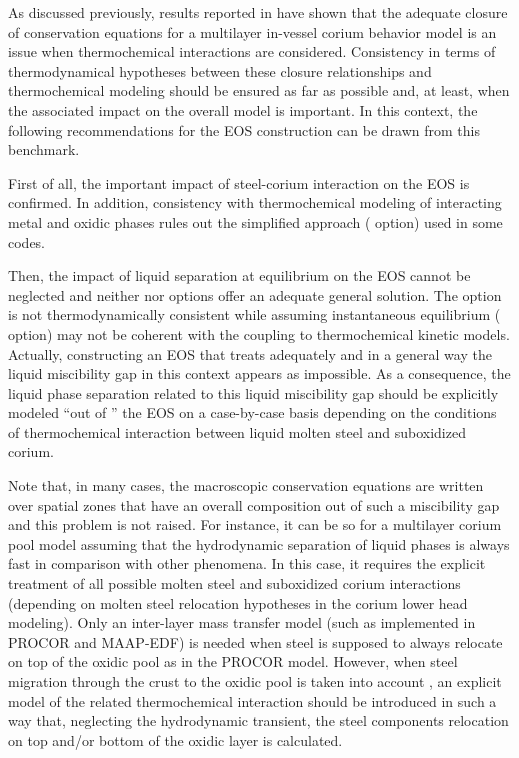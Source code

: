 As discussed previously, results reported in \cite{Bakouta2015} have shown that the adequate closure of conservation equations for a multilayer in-vessel corium behavior model is an issue when thermochemical interactions are considered. Consistency in terms of thermodynamical hypotheses between these closure relationships and thermochemical modeling should be ensured as far as possible and, at least, when the associated impact on the overall model is important. In this context, the following recommendations for the EOS construction can be drawn from this benchmark.

First of all, the important impact of steel-corium interaction on the EOS is confirmed. In addition, consistency with thermochemical modeling of interacting metal and oxidic phases rules out the simplified approach ( option) used in some codes.

Then, the impact of liquid separation at equilibrium on the EOS cannot be neglected and neither  nor  options offer an adequate general solution. The  option is not thermodynamically consistent while assuming instantaneous equilibrium ( option) may not be coherent with the coupling to thermochemical kinetic models. Actually, constructing an EOS that treats adequately and in a general way the liquid miscibility gap in this context appears as impossible. As a consequence, the liquid phase separation related to this liquid miscibility gap should be explicitly modeled ``out of '' the EOS on a case-by-case basis depending on the conditions of thermochemical interaction between liquid molten steel and suboxidized corium. 
 
\begin{remark}
 Note that, in many cases, the macroscopic conservation equations are written over spatial zones that have an overall composition out of such a miscibility gap and this problem is not raised. For instance, it can be so for a multilayer corium pool model assuming that the hydrodynamic separation of liquid phases is always fast in comparison with other phenomena. In this case, it requires the explicit treatment of all possible molten steel and suboxidized corium interactions (depending on molten steel relocation hypotheses in the corium lower head modeling). Only an inter-layer mass transfer model (such as \cite{LeTellier2014} implemented in PROCOR and MAAP-EDF) is needed when steel is supposed to always relocate on top of the oxidic pool as in the PROCOR model. However, when steel migration through the crust to the oxidic pool is taken into account , an explicit model of the related thermochemical interaction should be introduced in such a way that, neglecting the hydrodynamic transient, the steel components relocation on top and/or bottom of the oxidic layer is calculated.
\end{remark}

